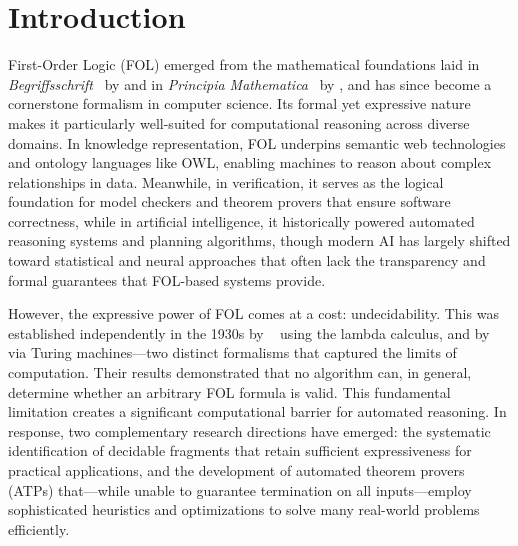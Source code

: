 \newpage\pagestyle{introduction}


\chapter*{Introduction}

First-Order Logic (FOL) emerged from the mathematical foundations laid in \emph{Begriffsschrift}~\cite{frege1879} by \citeauthor{frege1879} and in \emph{Principia Mathematica}~\cite{russell1910} by \citeauthor{russell1910}, and has since become a cornerstone formalism in computer science.
Its formal yet expressive nature makes it particularly well-suited for computational reasoning across diverse domains.
In knowledge representation, FOL underpins semantic web technologies and ontology languages like OWL, enabling machines to reason about complex relationships in data.
Meanwhile, in verification, it serves as the logical foundation for model checkers and theorem provers that ensure software correctness, while in artificial intelligence, it historically powered automated reasoning systems and planning algorithms, though modern AI has largely shifted toward statistical and neural approaches that often lack the transparency and formal guarantees that FOL-based systems provide.

However, the expressive power of FOL comes at a cost: undecidability.
This was established independently in the 1930s by \citeauthor{church1936}~\cite{church1936} using the lambda calculus, and by \citeauthor{turing1936}~\cite{turing1936} via Turing machines---two distinct formalisms that captured the limits of computation.
Their results demonstrated that no algorithm can, in general, determine whether an arbitrary FOL formula is valid. This fundamental limitation creates a significant computational barrier for automated reasoning.
In response, two complementary research directions have emerged: the systematic identification of decidable fragments that retain sufficient expressiveness for practical applications, and the development of automated theorem provers (ATPs) that---while unable to guarantee termination on all inputs---employ sophisticated heuristics and optimizations to solve many real-world problems efficiently.

